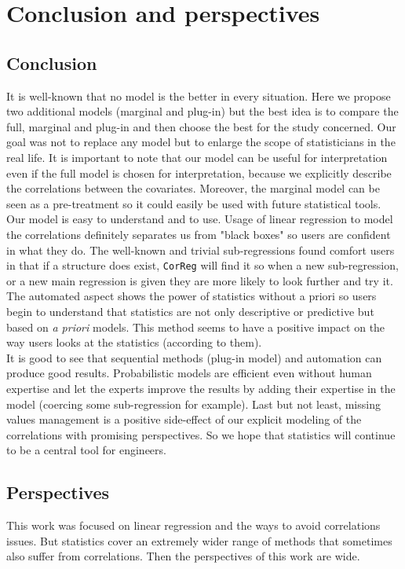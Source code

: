 \documentclass[12pt,a4paper]{report}
\begin{document}
\chapter{Conclusion and perspectives}
	\section{Conclusion}
		It is well-known that no model is the better in every situation. Here we propose two additional models (marginal and plug-in) but the best idea is to compare the full, marginal and plug-in and then choose the best for the study concerned. Our goal was not to replace any model but to enlarge the scope of statisticians in the real life. It is important to note that our model can be useful for interpretation even if the full model is chosen for interpretation, because we explicitly describe the correlations between the covariates. Moreover, the marginal model can be seen as a pre-treatment so it could easily be used with future statistical tools. \\
		
		Our model is easy to understand and to use. Usage of linear regression to model the correlations definitely separates us from "black boxes" so users are confident in what they do. The well-known and trivial sub-regressions found comfort users in that if a structure does exist, {\tt CorReg} will find it so when a new sub-regression, or a new main regression is given they are more likely to look further and try it. The automated aspect shows the power of statistics without a priori so users begin to understand that statistics are not only descriptive or predictive but based on {\it a priori} models. This method seems to have a positive impact on the way users looks at the statistics (according to them). \\
		
		It is good to see that sequential methods (plug-in model) and automation can produce good results. Probabilistic models are efficient even without human expertise and let the experts improve the results by adding their expertise in the model (coercing some sub-regression for example). Last but not least, missing values management is a positive side-effect of our explicit modeling of the correlations with promising perspectives.
		 So we hope that statistics will continue to be a central tool for engineers.\\
					
		
	\section{Perspectives}
	This work was focused on linear regression and the ways to avoid correlations issues. But statistics cover an extremely wider range of methods that sometimes also suffer from correlations. Then the perspectives of this work are wide.
\end{document}
